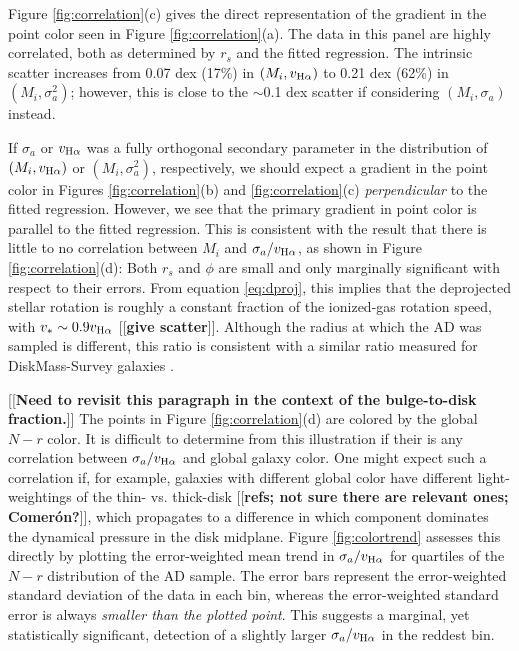 \documentclass[apj,iop,revtex4,numberedappendix]{emulateapj}
\newcommand{\comment}[2][todo]{{\color{#1}[[{\bf #2}]]}}
\begin{document}
Figure \ref{fig:correlation}(c) gives the direct representation of the
gradient in the point color seen in Figure \ref{fig:correlation}(a).
The data in this panel are highly correlated, both as determined by
$r_s$ and the fitted regression.  The intrinsic scatter increases from
0.07 dex (17\%) in $(M_i,v_{{\rm H}\alpha})$ to 0.21 dex (62\%) in
$(M_i,\sigma_a^2)$; however, this is close to the $\sim$0.1 dex scatter
if considering $(M_i,\sigma_a)$ instead.

If $\sigma_a$ or $v_{{\rm H}\alpha}$ was a fully orthogonal secondary
parameter in the distribution of $(M_i,v_{{\rm H}\alpha})$ or
$(M_i,\sigma_a^2)$, respectively, we should expect a gradient in the
point color in Figures \ref{fig:correlation}(b) and
\ref{fig:correlation}(c) {\em perpendicular} to the fitted regression.
However, we see that the primary gradient in point color is parallel to
the fitted regression.  This is consistent with the result that there is
little to no correlation between $M_i$ and $\sigma_a/v_{{\rm H}\alpha}$,
as shown in Figure \ref{fig:correlation}(d):  Both $r_s$ and $\phi$ are
small and only marginally significant with respect to their errors.
From equation \ref{eq:dproj}, this implies that the deprojected stellar
rotation is roughly a constant fraction of the ionized-gas rotation
speed, with $v_{\ast} \sim 0.9 v_{{\rm H}\alpha}$ \comment{give
scatter}.  Although the radius at which the AD was sampled is different,
this ratio is consistent with a similar ratio measured for
DiskMass-Survey galaxies \citep{2013A&A...557A.130M}.

\comment{Need to revisit this paragraph in the context of the
bulge-to-disk fraction.}  The points in Figure \ref{fig:correlation}(d)
are colored by the global $N-r$ color.  It is difficult to determine
from this illustration if their is any correlation between
$\sigma_a/v_{{\rm H}\alpha}$ and global galaxy color.  One might expect
such a correlation if, for example, galaxies with different global color
have different light-weightings of the thin- vs. thick-disk
\comment{refs; not sure there are relevant ones; Comer\'{o}n?}, which
propagates to a difference in which component dominates the dynamical
pressure in the disk midplane.  Figure \ref{fig:colortrend} assesses
this directly by plotting the error-weighted mean trend in
$\sigma_a/v_{{\rm H}\alpha}$ for quartiles of the $N-r$ distribution of
the AD sample.  The error bars represent the error-weighted standard
deviation of the data in each bin, whereas the error-weighted standard
error is always {\it smaller than the plotted point}.  This suggests a
marginal, yet statistically significant, detection of a slightly larger
$\sigma_a/v_{{\rm H}\alpha}$ in the reddest bin.
\end{document}
